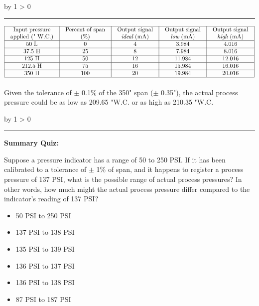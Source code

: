 \documentclass[12pt,a4paper]{article}
\def\svar{
           \advance\answnum by 1
           \ifnum \answnum > 0
                \hrule
                \vskip 3pt
                \leftline{Svar \the\answnum}
                \vskip 3pt \fi}
\def\notes{
           \advance\explnum by 1
           \ifnum \explnum > 0
                \hrule
                \vskip 3pt
                \leftline{Notes \the\explnum}
                \vskip 3pt \fi}
\begin{document}
\vskip 10pt \filbreak 





\svar{} 


$$\vbox{\offinterlineskip
\halign{\strut
\vrule \quad\hfil # \ \hfil & 
\vrule \quad\hfil # \ \hfil & 
\vrule \quad\hfil # \ \hfil & 
\vrule \quad\hfil # \ \hfil & 
\vrule \quad\hfil # \ \hfil \vrule \cr
\noalign{\hrule}
%
Input pressure & Percent of span & Output signal & Output signal & Output signal \cr
%
applied (" W.C.) & (\%) & {\it ideal} (mA) & {\it low} (mA) & {\it high} (mA) \cr
%
\noalign{\hrule}
%
50 L & 0 & 4 & 3.984 & 4.016 \cr
%
\noalign{\hrule}
%
37.5 H & 25 & 8 & 7.984 & 8.016 \cr
%
\noalign{\hrule}
%
125 H & 50 & 12 & 11.984 & 12.016 \cr
%
\noalign{\hrule}
%
212.5 H & 75 & 16 & 15.984 & 16.016 \cr
%
\noalign{\hrule}
%
350 H & 100 & 20 & 19.984 & 20.016 \cr
%
\noalign{\hrule}
} %
}$$ %


Given the tolerance of $\pm$ 0.1\% of the 350" span ($\pm$ 0.35"), the actual process pressure could be as low as 209.65 "W.C. or as high as 210.35 "W.C.

\vskip 10pt \filbreak 





\notes{} 








\vfil \eject

\noindent
{\bf Summary Quiz:}

Suppose a pressure indicator has a range of 50 to 250 PSI.  If it has been calibrated to a tolerance of $\pm$ 1\% of span, and it happens to register a process pressure of 137 PSI, what is the possible range of actual process pressures?  In other words, how much might the actual process pressure differ compared to the indicator's reading of 137 PSI?

\begin{itemize}
\item{} 50 PSI to 250 PSI
\vskip 5pt 
\item{} 137 PSI to 138 PSI
\vskip 5pt 
\item{} 135 PSI to 139 PSI
\vskip 5pt 
\item{} 136 PSI to 137 PSI
\vskip 5pt 
\item{} 136 PSI to 138 PSI
\vskip 5pt 
\item{} 87 PSI to 187 PSI
\end{itemize}
\end{document}
